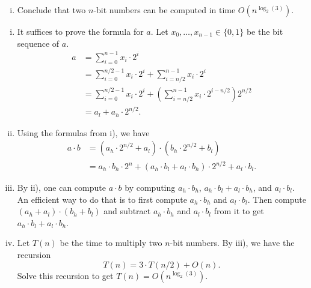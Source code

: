 \documentclass[11pt]{article}
\begin{document}
\begin{enumerate}[1)]
\begin{enumerate}[i)]
	\item Conclude that two $n$-bit numbers can be computed in time $O(n^{\log_2(3)})$.
\end{enumerate}

\begin{solution}
	\begin{enumerate}[i)]
		\item It suffices to prove the formula for $a$. Let $x_0, \ldots, x_{n-1} \in \{0, 1\}$ be the bit sequence of $a$. 
		\begin{align*}
		a &= \sum_{i=0}^{n-1} x_i \cdot 2^i \\
		&= \sum_{i=0}^{n/2-1} x_i \cdot 2^i + \sum_{i=n/2}^{n-1} x_i \cdot 2^i \\
		&= \sum_{i=0}^{n/2-1} x_i \cdot 2^i + \left(\sum_{i=n/2}^{n-1} x_i \cdot 2^{i-n/2}\right)2^{n/2} \\
		&= a_l + a_h \cdot 2^{n/2}.
		\end{align*}
		\item Using the formulas from i), we have
		\begin{align*}
		a \cdot b &= (a_h \cdot 2^{n/2} + a_l) \cdot (b_h \cdot 2^{n/2} + b_l) \\
		&= a_h \cdot b_h \cdot 2^n + (a_h \cdot b_l + a_l \cdot b_h) \cdot 2^{n/2} + a_l \cdot b_l.
		\end{align*}
		\item By ii), one can compute $a \cdot b$ by computing $a_h \cdot b_h$, $a_h \cdot b_l + a_l \cdot b_h$, and $a_l \cdot b_l$. 
		An efficient way to do that is to first compute $a_h \cdot b_h$ and $a_l \cdot b_l$. Then compute $(a_h + a_l) \cdot (b_h + b_l)$ and subtract $a_h \cdot b_h$ and $a_l \cdot b_l$ from it to get $a_h \cdot b_l + a_l \cdot b_h$.

		\item Let $T(n)$ be the time to multiply two $n$-bit numbers. By iii), we have the recursion
		\[T(n) = 3 \cdot T(n/2) + O(n).\]
		Solve this recursion to get $T(n) = O(n^{\log_2(3)})$.
	\end{enumerate}
\end{solution}


\end{enumerate}
\end{document}
